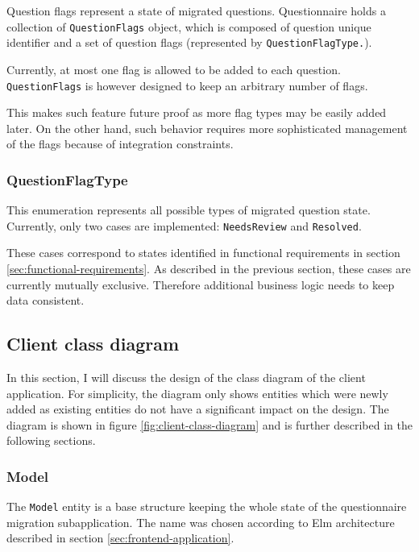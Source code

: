 Question flags represent a state of migrated questions.
Questionnaire holds a collection of \texttt{QuestionFlags} object, which is composed of question unique identifier and a set of question flags (represented by \texttt{QuestionFlagType.}).

Currently, at most one flag is allowed to be added to each question.
\texttt{QuestionFlags} is however designed to keep an arbitrary number of flags.

This makes such feature future proof as more flag types may be easily added later.
On the other hand, such behavior requires more sophisticated management of the flags because of integration constraints.

\subsubsection*{QuestionFlagType}

This enumeration represents all possible types of migrated question state.
Currently, only two cases are implemented: \texttt{NeedsReview} and \texttt{Resolved}.

These cases correspond to states identified in functional requirements in section \ref{sec:functional-requirements}.
As described in the previous section, these cases are currently mutually exclusive.
Therefore additional business logic needs to keep data consistent.

\subsection{Client class diagram}

In this section, I will discuss the design of the class diagram of the client application.
For simplicity, the diagram only shows entities which were newly added as existing entities do not have a significant impact on the design.
The diagram is shown in figure \ref{fig:client-class-diagram} and is further described in the following sections.


\subsubsection*{Model}

The \texttt{Model} entity is a base structure keeping the whole state of the questionnaire migration subapplication.
The name was chosen according to Elm architecture described in section \ref{sec:frontend-application}.

